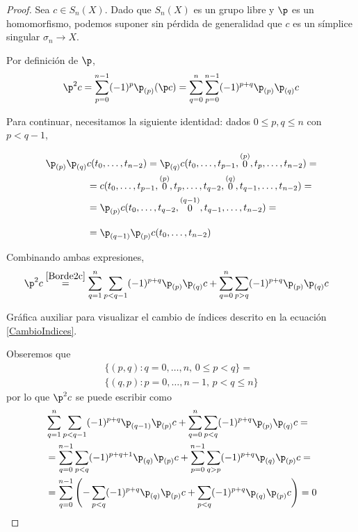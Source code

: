 \begin{proof}
Sea $c \in S_n(X)$. Dado que $S_n(X)$ es un grupo libre y $\p$ es un
homomorfismo, podemos suponer sin pérdida de generalidad que $c$ es un símplice
singular $\sigma_n \to X$.

Por definición de $\p$,
\begin{equation}
\label{Borde2c}
\p^2c=\sum^{n-1}_{p=0}(-1)^p\p_{(p)}(\p c)=
\sum^n_{q=0}\sum^{n-1}_{p=0}(-1)^{p+q}\p_{(p)}\p_{(q)}c
\end{equation}

Para continuar, necesitamos la siguiente identidad: dados $0 \leq p, q \leq n$
con $p < q-1$,

\begin{align*}
\p_{(p)}\p_{(q)}&c(t_0,\dots,t_{n-2})
	=\p_{(q)}c(t_0,\dots,t_{p-1},\stackrel{(p)}{0},t_p,\dots,t_{n-2})=\\
	&=c(t_0,\dots,t_{p-1},\stackrel{(p)}{0},t_p,\dots,t_{q-2},
	\stackrel{(q)}{0},t_{q-1},\dots,t_{n-2})=\\
	&=\p_{(p)}c(t_0,\dots,t_{q-2},\stackrel{(q-1)}{0},t_{q-1},\dots,t_{n-2})=\\[9pt]
	&=\p_{(q-1)}\p_{(p)}c(t_0,\dots,t_{n-2})
\end{align*}

Combinando ambas expresiones,
\begin{align*}
\p^2c
	&\stackrel{\eqref{Borde2c}}{=}
	\sum_{q=1}^n\sum_{p < q-1}(-1)^{p+q}\p_{(p)}\p_{(q)}c+
	\sum^n_{q=0}\sum_{p > q}(-1)^{p+q}\p_{(p)}\p_{(q)}c
\end{align*}

\begin{marginfigure}

\caption[Gráfica auxiliar que ilustra el cambio de índices.]{Gráfica auxiliar
para visualizar el cambio de índices descrito en la ecuación
\eqref{CambioIndices}.}
\end{marginfigure}
Obseremos que
\begin{multline} \label{CambioIndices}
\{(p,q)\colon q=0,\dots,n,\, 0\leq p<q\}=\\
\{(q,p)\colon p=0,\dots,n-1,\, p < q \leq n\}
\end{multline}
por lo que $\p^2c$ se puede escribir como
\begin{align*}
	&\sum_{q=1}^n\sum_{p < q-1}(-1)^{p+q}\p_{(q-1)}\p_{(p)}c+
	\sum^n_{q=0}\sum_{p < q}(-1)^{p+q}\p_{(p)}\p_{(q)}c=\\ 
	&=\sum_{q=0}^{n-1}\sum_{p < q}(-1)^{p+q+1}\p_{(q)}\p_{(p)}c+
	\sum^{n-1}_{p=0}\sum_{q > p}(-1)^{p+q}\p_{(q)}\p_{(p)}c=\\
	&=\sum_{q=0}^{n-1}\left(-\sum_{p < q}(-1)^{p+q}\p_{(q)}\p_{(p)}c+
	\sum_{p < q}(-1)^{p+q}\p_{(q)}\p_{(p)}c\right)=0
\end{align*}
\end{proof}


